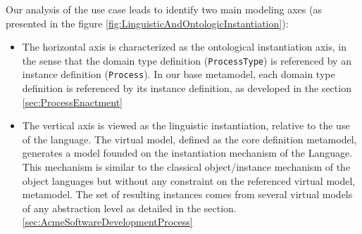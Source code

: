 Our analysis of the use case leads to identify two main modeling axes (as presented in the figure \ref{fig:LinguisticAndOntologicInstantiation}):
\begin{itemize}
    \item The horizontal axis is characterized as the ontological instantiation axis, in the sense that the domain type definition (\ie \texttt{ProcessType}) is referenced by an instance definition (\ie \texttt{Process}). In our base metamodel, each domain type definition is referenced by its instance definition, as developed in the section \ref{sec:ProcessEnactment}

\item The vertical axis is viewed as the linguistic instantiation, relative to the use of the \FML language. The virtual model, defined as the core definition metamodel, generates a model founded on the instantiation mechanism of the \FML Language. This mechanism is similar to the classical object/instance mechanism of the object languages but without any constraint on the referenced virtual model, \ie metamodel. The set of resulting instances comes from several virtual models
of any abstraction level as detailed in the section. \ref{sec:AcmeSoftwareDevelopmentProcess}



\end{itemize}

